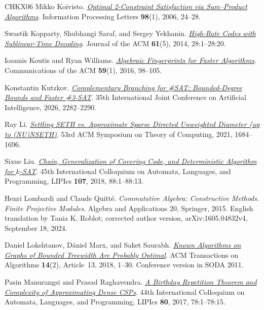 \documentclass[11pt,reqno]{amsart}
\numberwithin{equation}{section}
\theoremstyle{definition}\newtheorem{definition}[theorem]{Definition}
\theoremstyle{remark}\newtheorem{remark}[theorem]{Remark}
\begin{document}
\begin{thebibliography}{CHKX06}
Mikko Koivisto.
\href{https://doi.org/10.1016/j.ipl.2005.11.013}
{\emph{Optimal 2-Constraint Satisfaction via Sum--Product Algorithms}}.
Information Processing Letters \textbf{98}(1), 2006, 24--28.

Swastik Kopparty, Shubhangi Saraf, and Sergey Yekhanin.
\href{https://doi.org/10.1145/2629416}
{\emph{High-Rate Codes with Sublinear-Time Decoding}}.
Journal of the ACM \textbf{61}(5), 2014, 28:1--28:20.

Ioannis Koutis and Ryan Williams.
\href{https://doi.org/10.1145/2742544}
{\emph{Algebraic Fingerprints for Faster Algorithms}}.
Communications of the ACM \textbf{59}(1), 2016, 98--105.

Konstantin Kutzkov.
\href{https://doi.org/10.24963/ijcai.2026/254}
{\emph{Complementary Branching for \#SAT: Bounded-Degree Bounds and Faster \#3-SAT}}.
35th International Joint Conference on Artificial Intelligence, 2026, 2282--2290.

Ray Li.
\href{https://arxiv.org/abs/2008.05106}
{\emph{Settling SETH vs. Approximate Sparse Directed Unweighted Diameter
(up to (NU)NSETH)}}.
53rd ACM Symposium on Theory of Computing, 2021, 1684--1696.

Sixue Liu.
\href{https://doi.org/10.4230/LIPIcs.ICALP.2018.88}
{\emph{Chain, Generalization of Covering Code, and Deterministic Algorithm for $k$-SAT}}.
45th International Colloquium on Automata, Languages, and Programming,
LIPIcs \textbf{107}, 2018, 88:1--88:13.

Henri Lombardi and Claude Quitt\'e.
\emph{Commutative Algebra: Constructive Methods. Finite Projective Modules}.
Algebra and Applications 20, Springer, 2015.
English translation by Tania K. Roblot; corrected author version,
arXiv:1605.04832v4, September 18, 2024.

Daniel Lokshtanov, D\'aniel Marx, and Saket Saurabh.
\href{https://doi.org/10.1145/3170442}
{\emph{Known Algorithms on Graphs of Bounded Treewidth Are Probably Optimal}}.
ACM Transactions on Algorithms \textbf{14}(2), Article~13, 2018, 1--30.
Conference version in SODA 2011.

Pasin Manurangsi and Prasad Raghavendra.
\href{https://doi.org/10.4230/LIPIcs.ICALP.2017.78}
{\emph{A Birthday Repetition Theorem and Complexity of Approximating
Dense CSPs}}.
44th International Colloquium on Automata, Languages, and Programming,
LIPIcs \textbf{80}, 2017, 78:1--78:15.


\end{thebibliography}
\end{document}
